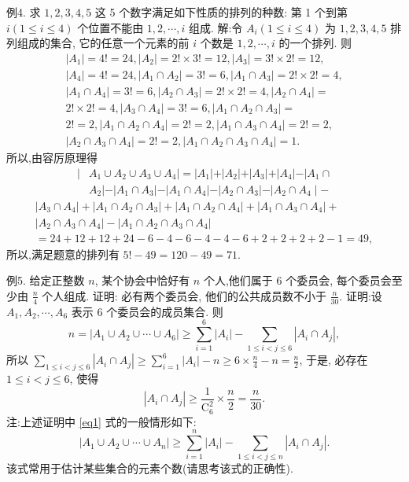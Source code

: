 例4. 求 $1,2,3,4,5$ 这 5 个数字满足如下性质的排列的种数: 第 1 个到第 $i(1 \leqslant i \leqslant 4)$ 个位置不能由 $1,2, \cdots, i$ 组成.
解:令 $A_i(1 \leqslant i \leqslant 4)$ 为 $1,2,3,4,5$ 排列组成的集合, 它的任意一个元素的前 $i$ 个数是 $1,2, \cdots, i$ 的一个排列.
则
$$
\begin{gathered}
\left|A_1\right|=4 !=24,\left|A_2\right|=2 ! \times 3 !=12,\left|A_3\right|=3 ! \times 2 !=12, \\
\left|A_4\right|=4 !=24,\left|A_1 \cap A_2\right|=3 !=6,\left|A_1 \cap A_3\right|=2 ! \times 2 !=4, \\
\left|A_1 \cap A_4\right|=3 !=6,\left|A_2 \cap A_3\right|=2 ! \times 2 !=4,\left|A_2 \cap A_4\right|= \\
2 ! \times 2 !=4,\left|A_3 \cap A_4\right|=3 !=6,\left|A_1 \cap A_2 \cap A_3\right|= \\
2 !=2,\left|A_1 \cap A_2 \cap A_4\right|=2 !=2,\left|A_1 \cap A_3 \cap A_4\right|=2 !=2, \\
\left|A_2 \cap A_3 \cap A_4\right|=2 !=2,\left|A_1 \cap A_2 \cap A_3 \cap A_4\right|=1 .
\end{gathered}
$$
所以,由容厉原理得
$$
\begin{aligned}
\mid & A_1 \cup A_2 \cup A_3 \cup A_4|=| A_1|+| A_2|+| A_3|+| A_4|-| A_1 \cap \\
& A_2|-| A_1 \cap A_3|-| A_1 \cap A_4|-| A_2 \cap A_3|-| A_2 \cap A_4 \mid-
\end{aligned}
$$
$$
\begin{gathered}
\left|A_3 \cap A_4\right|+\left|A_1 \cap A_2 \cap A_3\right|+\left|A_1 \cap A_2 \cap A_4\right|+\left|A_1 \cap A_3 \cap A_4\right|+ \\
\left|A_2 \cap A_3 \cap A_4\right|-\left|A_1 \cap A_2 \cap A_3 \cap A_4\right| \\
=24+12+12+24-6-4-6-4-4-6+2+2+2+2-1=49,
\end{gathered}
$$
所以,满足题意的排列有 $5 !-49=120-49=71$.



例5. 给定正整数 $n$, 某个协会中恰好有 $n$ 个人,他们属于 6 个委员会, 每个委员会至少由 $\frac{n}{4}$ 个人组成.
证明: 必有两个委员会, 他们的公共成员数不小于 $\frac{n}{30}$.
证明:设 $A_1, A_2, \cdots, A_6$ 表示 6 个委员会的成员集合.
则
$$
n=\left|A_1 \cup A_2 \cup \cdots \cup A_6\right| \geqslant \sum_{i=1}^6\left|A_i\right|-\sum_{1 \leqslant i<j \leqslant 6}\left|A_i \cap A_j\right|, \label{eq1}
$$
所以 $\sum_{1 \leqslant i<j \leqslant 6}\left|A_i \cap A_j\right| \geqslant \sum_{i=1}^6\left|A_i\right|-n \geqslant 6 \times \frac{n}{4}-n=\frac{n}{2}$, 于是, 必存在 $1 \leqslant i<j \leqslant 6$, 使得
$$
\left|A_i \cap A_j\right| \geqslant \frac{1}{\mathrm{C}_6^2} \times \frac{n}{2}=\frac{n}{30} .
$$
注:上述证明中 \ref{eq1} 式的一般情形如下:
$$
\left|A_1 \cup A_2 \cup \cdots \cup A_n\right| \geqslant \sum_{i=1}^n\left|A_i\right|-\sum_{1 \leqslant i<j \leqslant n}\left|A_i \cap A_j\right| .
$$
该式常用于估计某些集合的元素个数(请思考该式的正确性).



